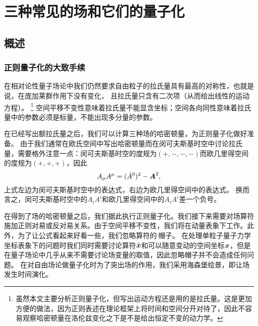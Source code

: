 \chapter{三种常见的场和它们的量子化}

\section{概述}

\subsection{正则量子化的大致手续}\label{sec:canonical-general}

在相对论性量子场论中我们仍然要求自由粒子的拉氏量具有最高的对称性，也就是说，在庞加莱群作用下没有变化，
且拉氏量只含有二次项（从而给出线性的运动方程）。%
\footnote{虽然本文主要分析正则量子化，但写出运动方程还是用的是拉氏量。这是更加方便的做法，因为正则表述在理论框架上将时间和空间分开对待了，因此不容易观察哈密顿量在洛伦兹变化之下是不是给出恒定不变的动力学。}
空间平移不变性意味着拉氏量不能显含坐标；空间各向同性意味着拉氏量中的参数必须是标量，不能出现多分量的参数。

在已经写出额拉氏量之后，我们可以计算三种场的哈密顿量，为正则量子化做好准备。
由于我们通常在欧氏空间中写出哈密顿量而在闵可夫斯基时空中讨论拉氏量，需要格外注意一点：闵可夫斯基时空的度规为$(+, -, -, -)$而欧几里得空间的度规为$(+, +, +)$，因此
\[
    A_\mu A^\mu = (\dot{A}^0)^2 - \vb*{A}^2,
\]
上式左边为闵可夫斯基时空中的表达式，右边为欧几里得空间中的表达式。
换而言之，闵可夫斯基时空中的$A_i A^i$和欧几里得空间中的$A_i A^i$差一个负号。

在得到了场的哈密顿量之后，我们据此执行正则量子化。我们接下来需要对场算符施加正则对易或反对易关系。由于空间平移不变性，我们将在动量表象下工作。此外，为了让公式看起来好看一些，我们忽略算符的$\hat{\ }$帽子。
在处理单粒子量子力学坐标表象下的问题时我们同时需要讨论算符$\hat{\vb*{x}}$和可以随意变动的空间坐标$\vb*{x}$，但是在量子场论中几乎从来不需要讨论场变量的取值，因此忽略帽子并不会造成任何问题。
在对自由场论做量子化时为了突出场的作用，我们采用海森堡绘景，即让场发生时间演化。


